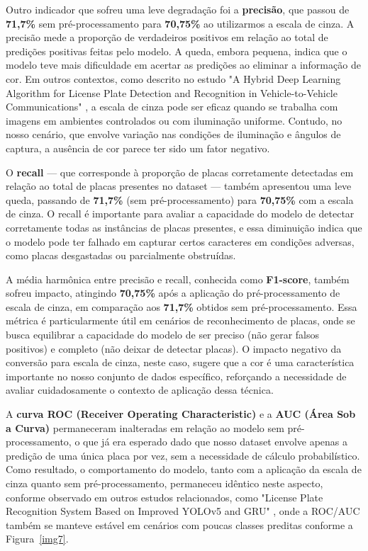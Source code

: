 \documentclass[conference]{IEEEtran}
\begin{document}
Outro indicador que sofreu uma leve degradação foi a \textbf{precisão}, que passou de \textbf{71,7\%} sem pré-processamento para \textbf{70,75\%} ao utilizarmos a escala de cinza. A precisão mede a proporção de verdadeiros positivos em relação ao total de predições positivas feitas pelo modelo. A queda, embora pequena, indica que o modelo teve mais dificuldade em acertar as predições ao eliminar a informação de cor. Em outros contextos, como descrito no estudo "A Hybrid Deep Learning Algorithm for License Plate Detection and Recognition in Vehicle-to-Vehicle Communications" \cite{b7}, a escala de cinza pode ser eficaz quando se trabalha com imagens em ambientes controlados ou com iluminação uniforme. Contudo, no nosso cenário, que envolve variação nas condições de iluminação e ângulos de captura, a ausência de cor parece ter sido um fator negativo.

O \textbf{recall} — que corresponde à proporção de placas corretamente detectadas em relação ao total de placas presentes no dataset — também apresentou uma leve queda, passando de \textbf{71,7\%} (sem pré-processamento) para \textbf{70,75\%} com a escala de cinza. O recall é importante para avaliar a capacidade do modelo de detectar corretamente todas as instâncias de placas presentes, e essa diminuição indica que o modelo pode ter falhado em capturar certos caracteres em condições adversas, como placas desgastadas ou parcialmente obstruídas.

A média harmônica entre precisão e recall, conhecida como \textbf{F1-score}, também sofreu impacto, atingindo \textbf{70,75\%} após a aplicação do pré-processamento de escala de cinza, em comparação aos \textbf{71,7\%} obtidos sem pré-processamento. Essa métrica é particularmente útil em cenários de reconhecimento de placas, onde se busca equilibrar a capacidade do modelo de ser preciso (não gerar falsos positivos) e completo (não deixar de detectar placas). O impacto negativo da conversão para escala de cinza, neste caso, sugere que a cor é uma característica importante no nosso conjunto de dados específico, reforçando a necessidade de avaliar cuidadosamente o contexto de aplicação dessa técnica.

A \textbf{curva ROC (Receiver Operating Characteristic)} e a \textbf{AUC (Área Sob a Curva)} permaneceram inalteradas em relação ao modelo sem pré-processamento, o que já era esperado dado que nosso dataset envolve apenas a predição de uma única placa por vez, sem a necessidade de cálculo probabilístico. Como resultado, o comportamento do modelo, tanto com a aplicação da escala de cinza quanto sem pré-processamento, permaneceu idêntico neste aspecto, conforme observado em outros estudos relacionados, como "License Plate Recognition System Based on Improved YOLOv5 and GRU" \cite{b8}, onde a ROC/AUC também se manteve estável em cenários com poucas classes preditas conforme a Figura~\ref{img7}.
\end{document}
